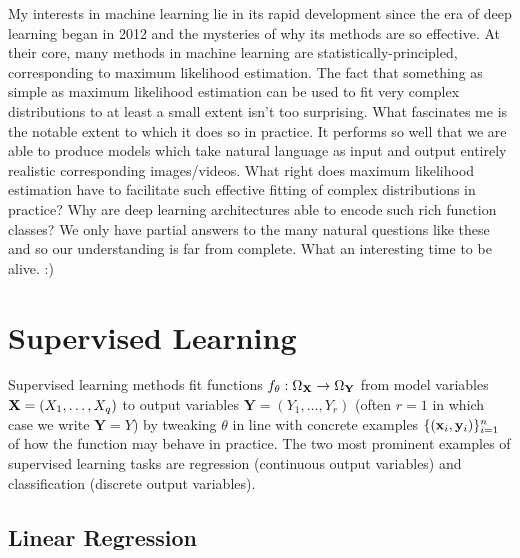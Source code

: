 \documentclass[11pt]{article}
\begin{document}
My interests in machine learning lie in its rapid development since the era of deep learning began in 2012 and the mysteries of why its methods are so effective. At their core, many methods in machine learning are statistically-principled, corresponding to maximum likelihood estimation. The fact that something as simple as maximum likelihood estimation can be used to fit very complex distributions to at least a small extent isn't too surprising. What fascinates me is the notable extent to which it does so in practice. It performs so well that we are able to produce models which take natural language as input and output entirely realistic corresponding images/videos. What right does maximum likelihood estimation have to facilitate such effective fitting of complex distributions in practice? Why are deep learning architectures able to encode such rich function classes? We only have partial answers to the many natural questions like these and so our understanding is far from complete. What an interesting time to be alive. :)

\section{Supervised Learning}
Supervised learning methods fit functions $f_{\theta}:\Omega_{\mathbf{X}}\to\Omega_{\mathbf{Y}}$ from model variables $\mathbf{X}=(X_1,\dots,X_q)$ to output variables $\mathbf{Y}=(Y_1,\dots,Y_r)$ (often $r=1$ in which case we write $\mathbf{Y}=Y$) by tweaking $\theta$ in line with concrete examples $\{(\mathbf{x}_i,\mathbf{y}_i)\}_{i=1}^n$ of how the function may behave in practice. The two most prominent examples of supervised learning tasks are regression (continuous output variables) and classification (discrete output variables).

\subsection{Linear Regression}
\end{document}
